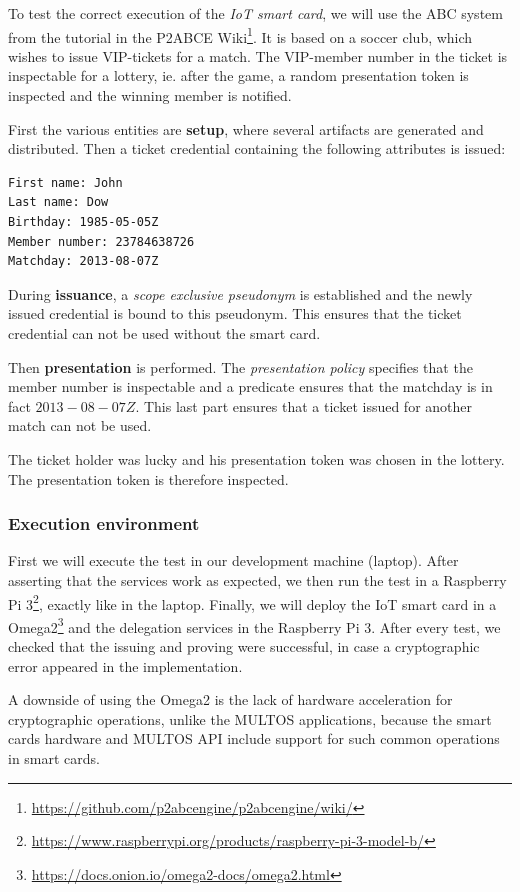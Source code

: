 \documentclass[journal]{IEEEtran}
\begin{document}
To test the correct execution of the \textit{IoT smart card}, we will use the ABC system from the tutorial in the P2ABCE Wiki\footnote{\url{https://github.com/p2abcengine/p2abcengine/wiki/}}. It is based on a soccer club, which wishes to issue VIP-tickets for a match. The VIP-member number in the ticket is inspectable for a lottery, ie. after the game, a random presentation token is inspected and the winning member is notified.

First the various entities are \textbf{setup}, where several artifacts are generated and distributed. Then a ticket credential containing the following attributes is issued:

\begin{verbatim}
First name: John
Last name: Dow
Birthday: 1985-05-05Z
Member number: 23784638726
Matchday: 2013-08-07Z
\end{verbatim}

During \textbf{issuance}, a \textit{scope exclusive pseudonym} is established and the newly issued credential is bound to this pseudonym. This ensures that the ticket credential can not be used without the smart card.

Then \textbf{presentation} is performed. The \textit{presentation policy} specifies that the member number is inspectable and a predicate ensures that the matchday is in fact $2013-08-07Z$. This last part ensures that a ticket issued for another match can not be used.

The ticket holder was lucky and his presentation token was chosen in the lottery. The presentation token is therefore inspected.


\hfil

\subsubsection{Execution environment}

First we will execute the test in our development machine (laptop). After asserting that the services work as expected, we then run the test in a Raspberry Pi 3\footnote{\url{https://www.raspberrypi.org/products/raspberry-pi-3-model-b/}}, exactly like in the laptop. Finally, we will deploy the IoT smart card in a Omega2\footnote{\url{https://docs.onion.io/omega2-docs/omega2.html}} and the delegation services in the Raspberry Pi 3. After every test, we checked that the issuing and proving were successful, in case a cryptographic error appeared in the implementation. 

A downside of using the Omega2 is the lack of hardware acceleration for cryptographic operations, unlike the MULTOS applications, because the smart cards hardware and MULTOS API include support for such common operations in smart cards.
\end{document}
